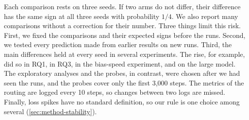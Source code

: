 Each comparison rests on three seeds. If two arms do not differ, their difference has the same sign at all three seeds with probability $1/4$. We also report many comparisons without a correction for their number. Three things limit this risk. First, we fixed the comparisons and their expected signs before the runs. Second, we tested every prediction made from earlier results on new runs. Third, the main differences held at every seed in several experiments. The rise, for example, did so in RQ1, in RQ3, in the bias-speed experiment, and on the large model. The exploratory analyses and the probes, in contrast, were chosen after we had seen the runs, and the probes cover only the first 3,000 steps. The metrics of the routing are logged every 10 steps, so changes between two logs are missed. Finally, loss spikes have no standard definition, so our rule is one choice among several (\cref{sec:method-stability}).
